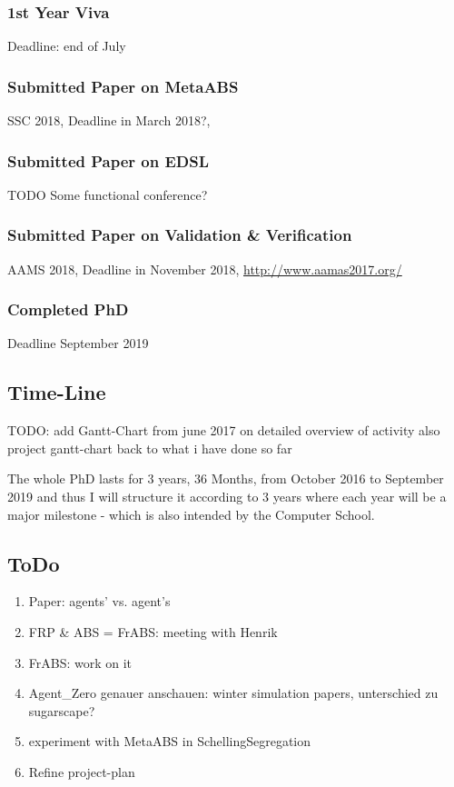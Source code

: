 \subsubsection*{1st Year Viva}
Deadline: end of July

\subsubsection*{Submitted Paper on MetaABS}
SSC 2018, Deadline in March 2018?, 

\subsubsection*{Submitted Paper on EDSL}
TODO Some functional conference?

\subsubsection*{Submitted Paper on Validation \& Verification}
AAMS 2018, Deadline in November 2018, \url{http://www.aamas2017.org/}

\subsubsection*{Completed PhD}
Deadline September 2019


\subsection{Time-Line}
TODO: add Gantt-Chart
from june 2017 on detailed overview of activity
also project gantt-chart back to what i have done so far

The whole PhD lasts for 3 years, 36 Months, from October 2016 to September 2019 and thus I will structure it according to 3 years where each year will be a major milestone - which is also intended by the Computer School.

\subsection{ToDo}
\begin{enumerate}
	\item Paper: agents' vs. agent's
	\item FRP \& ABS = FrABS: meeting with Henrik
	\item FrABS: work on it
	\item Agent_Zero genauer anschauen: winter simulation papers, unterschied zu sugarscape?
	\item experiment with MetaABS in SchellingSegregation
	\item Refine project-plan 
\end{enumerate}







